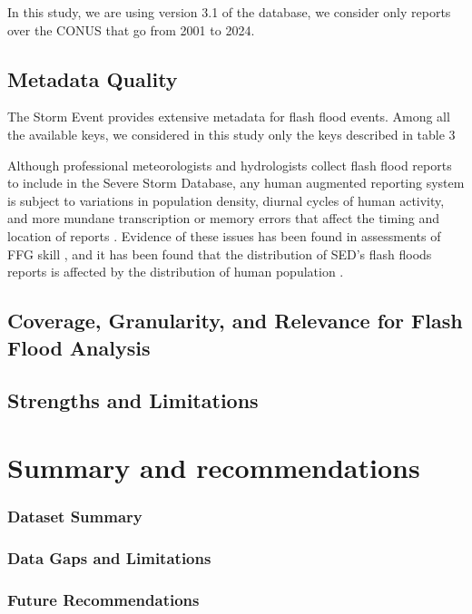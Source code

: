 In this study, we are using version 3.1 of the database, we consider only reports over the CONUS that go from 2001 to 2024.


\subsection{Metadata Quality}

The Storm Event provides extensive metadata for flash flood events. Among all the available keys, we considered in this study only the keys described in table 3





Although professional meteorologists and hydrologists collect flash flood reports to include in the Severe Storm Database, any human augmented reporting system is subject to variations in population density, diurnal cycles of human activity, and more mundane transcription or memory errors that affect the timing and location of reports \citep{Barthold_2015}. Evidence of these issues has been found in assessments of FFG skill \citep{Clark_2014}, and it has been found that the distribution of SED's flash floods reports is affected by the distribution of human population \cite{Marjerison_2016}. 



\subsection{Coverage, Granularity, and Relevance for Flash Flood Analysis}

\subsection{Strengths and Limitations}


































\section{Summary and recommendations}

\subsubsection{Dataset Summary}

\subsubsection{Data Gaps and Limitations}

\subsubsection{Future Recommendations}